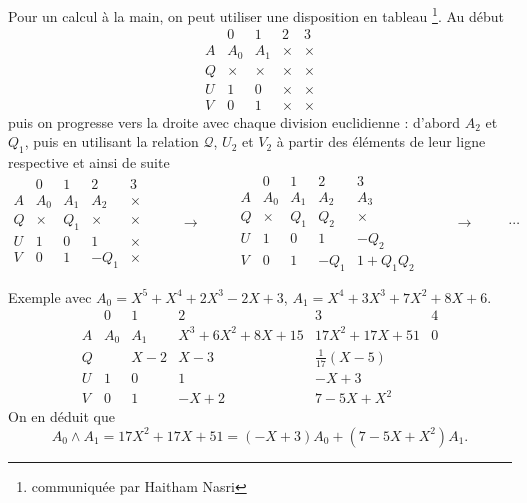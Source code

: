 Pour un calcul \og à la main\fg, on peut utiliser une disposition en tableau \footnote{communiquée par Haitham Nasri}. Au début
\begin{displaymath}
\renewcommand{\arraystretch}{1.2}
\begin{array}{l|l|l|l|l}
  & 0 & 1 & 2 & 3 \\ \hline
A & A_0 & A_1 & × & × \\ 
Q & × & × & × & × \\ 
U & 1 & 0 & × & × \\
V & 0 & 1 & × & ×
\end{array}
\end{displaymath}
puis on progresse vers la droite avec chaque division euclidienne : d'abord $A_2$ et $Q_1$, puis en utilisant la relation $\mathcal Q$,  $U_2$ et $V_2$ à partir des éléments de leur ligne respective et ainsi de suite
\begin{displaymath}
\renewcommand{\arraystretch}{1.2}
\begin{array}{l|l|l|l|l}
  & 0 & 1 & 2 & 3 \\ \hline
A & A_0 & A_1 & A_2 & × \\ 
Q & ×   & Q_1 & ×   & × \\ 
U & 1   & 0   & 1 & × \\
V & 0   & 1   & -Q_1 & ×
\end{array}
\hspace{1cm}\rightarrow\hspace{1cm}
\begin{array}{l|l|l|l|l}
  & 0   & 1   & 2    & 3 \\ \hline
A & A_0 & A_1 & A_2  & A_3 \\ 
Q & ×   & Q_1 & Q_2  & × \\ 
U & 1   & 0   & 1    & -Q_2 \\
V & 0   & 1   & -Q_1 & 1+Q_1Q_2
\end{array}
\hspace{1cm}\rightarrow \hspace{1cm}\cdots
\end{displaymath}

Exemple avec $A_0 = X^5 + X^4 + 2X^3 - 2X +3$, $A_1 = X^4 + 3X^3 + 7X^2 + 8X + 6$.
\[
\renewcommand{\arraystretch}{1.2}
\begin{array}{l|l|l|l|l|l}
  & 0   & 1   & 2              & 3                 & 4\\ \hline
A & A_0 & A_1 & X^3+6X^2+8X+15 & 17X^2+17X+51      &  0 \\ 
Q &     & X-2 & X-3            & \frac{1}{17}(X-5) & \\ 
U & 1   & 0   & 1              & -X + 3            & \\
V & 0   & 1   & -X + 2         & 7 - 5X + X^2      &
\end{array}
\]
On en déduit que 
\[
 A_0 \wedge A_1 = 17X^2+17X+51 = (-X+3)A_0 + (7-5X+X^2)A_1.
\]


